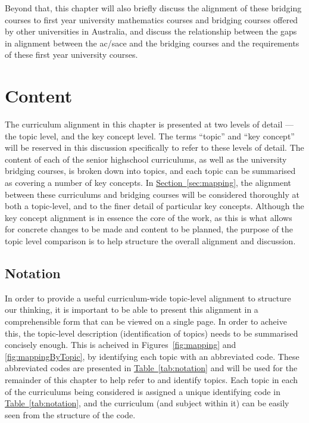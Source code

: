 \documentclass[twoside,12pt,a4paper]{report}
\newcommand{\refsec}[1]{\hyperref[sec:#1]{Section~\ref{sec:#1}}}
\newcommand{\reftab}[1]{\hyperref[tab:#1]{Table~\ref{tab:#1}}}
\begin{document}
Beyond that, this chapter will also briefly discuss the alignment of these bridging courses to first year university mathematics courses and bridging courses offered by other universities in Australia, and discuss the relationship between the gaps in alignment between the \gls{ac}/\gls{sace} and the bridging courses and the requirements of these first year university courses. 



\section{Content}
\label{sec:content}

The curriculum alignment in this chapter is presented at two levels of detail --- the topic level, and the key concept level. The terms ``topic'' and ``key concept'' will be reserved in this discussion specifically to refer to these levels of detail. The content of each of the senior highschool curriculums, as well as the university bridging courses, is broken down into topics, and each topic can be summarised as covering a number of key concepts. In \refsec{mapping}, the alignment between these curriculums and bridging courses will be considered thoroughly at both a topic-level, and to the finer detail of particular key concepts. Although the key concept alignment is in essence the core of the work, as this is what allows for concrete changes to be made and content to be planned, the purpose of the topic level comparison is to help structure the overall alignment and discussion. 

\subsection{Notation}

In order to provide a useful curriculum-wide topic-level alignment to structure our thinking, it is important to be able to present this alignment in a comprehensible form that can be viewed on a single page. In order to acheive this, the topic-level description (identification of topics) needs to be summarised concisely enough. This is acheived in Figures~\ref{fig:mapping} and \ref{fig:mappingByTopic}, by identifying each topic with an abbreviated code. These abbreviated codes are presented in \reftab{notation} and will be used for the remainder of this chapter to help refer to and identify topics. Each topic in each of the curriculums being considered is assigned a unique identifying code in \reftab{notation}, and the curriculum (and subject within it) can be easily seen from the structure of the code.
\end{document}
